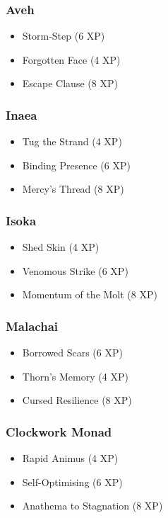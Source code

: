 \subsubsection{Aveh}
\begin{itemize}
\item Storm-Step (6 XP)
\item Forgotten Face (4 XP)
\item Escape Clause (8 XP)
\end{itemize}

\subsubsection{Inaea}
\begin{itemize}
\item Tug the Strand (4 XP)
\item Binding Presence (6 XP)
\item Mercy's Thread (8 XP)
\end{itemize}

\subsubsection{Isoka}
\begin{itemize}
\item Shed Skin (4 XP)
\item Venomous Strike (6 XP)
\item Momentum of the Molt (8 XP)
\end{itemize}

\subsubsection{Malachai}
\begin{itemize}
\item Borrowed Scars (6 XP)
\item Thorn's Memory (4 XP)
\item Cursed Resilience (8 XP)
\end{itemize}

\subsubsection{Clockwork Monad}
\begin{itemize}
\item Rapid Animus (4 XP)
\item Self-Optimising (6 XP)
\item Anathema to Stagnation (8 XP)
\end{itemize}

